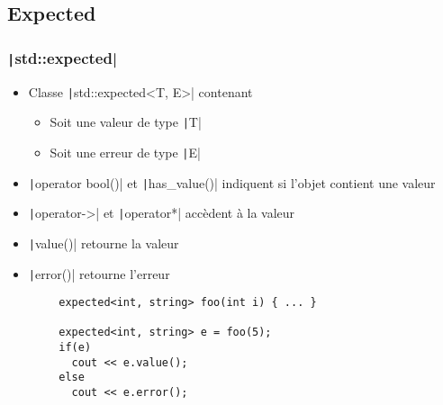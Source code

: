 \documentclass[C++.tex]{subfiles}
\begin{document}
\subsection*{Expected}
\begin{frame}[fragile]
	\frametitle{\texttt|std::expected|}
	\begin{itemize}
		\item Classe \texttt|std::expected<T, E>| contenant
		\begin{itemize}
			\item Soit une valeur de type \texttt|T|
			\item Soit une erreur de type \texttt|E|
		\end{itemize}
		\item \texttt|operator bool()| et \texttt|has_value()| indiquent si l'objet contient une valeur
		\item \texttt|operator->| et \texttt|operator*| accèdent à la valeur
		\item \texttt|value()| retourne la valeur
		\item \texttt|error()| retourne l'erreur
	\end{itemize}

	\begin{verbatim}
		expected<int, string> foo(int i) { ... }

		expected<int, string> e = foo(5);
		if(e)
		  cout << e.value();
		else
		  cout << e.error();
	\end{verbatim}



\end{frame}
\end{document}
